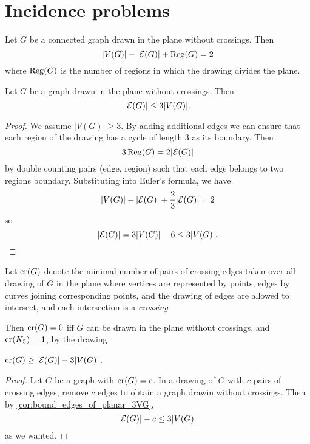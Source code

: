 
\section{Incidence problems}
\begin{theorem}
Let $G$ be a connected graph drawn in the plane without crossings. Then
\[
|V(G)| - |\edges (G)| + \reg (G) =2
\]
where $\reg (G)$ is the number of regions in which the drawing divides the plane.
\end{theorem}

\begin{corollary} \label{cor:bound_edges_of_planar_3VG}
Let $G$ be a graph drawn in the plane without crossings. Then
\[
|\edges (G) |\leq 3 |V(G)|.
\]
\end{corollary}
\begin{proof}	
We assume $|V(G)|\geq 3$. By adding additional edges we can ensure that each region of the drawing has a cycle of length 3 as its boundary. Then
\[
3 \reg(G) = 2 |\edges (G)|
\]
by double counting pairs (edge, region) such that each edge belongs to two regions boundary. Substituting into Euler's formula, we have 
\[
|V(G)| - |\edges (G)| + \frac{2}{3}|\edges (G)| = 2
\]
so
\[
|\edges (G)| = 3 | V(G)| - 6 \leq 3 |V(G)|.
\]
\end{proof}

Let $\crossings(G)$ denote the minimal number of pairs of crossing edges taken over all drawing of $G$ in the plane  where vertices are represented by points, edges by curves joining corresponding points, and the drawing of edges are allowed to intersect, and each intersection is a \emph{crossing}.

Then $\crossings(G)=0$ iff $G$ can be drawn in the plane without crossings, and $\crossings(K_5)=1$, by the drawing
\begin{center}
\begin{tikzpicture}

\end{tikzpicture}
\end{center}


\begin{corollary} \label{cor:bound_crossings_planar_graph93}
$\crossings(G) \geq |\edges (G)| - 3 |V(G)|$.
\end{corollary}
\begin{proof}	
Let $G$ be a graph with $\crossings(G) = c$. In a drawing of $G$ with $c$ pairs of crossing edges, remove $c$ edges to obtain a graph drawin without crossings. Then by \cref{cor:bound_edges_of_planar_3VG},
\[
|\edges (G)| - c \leq 3 |V(G)|
\]
as we wanted.
\end{proof}


